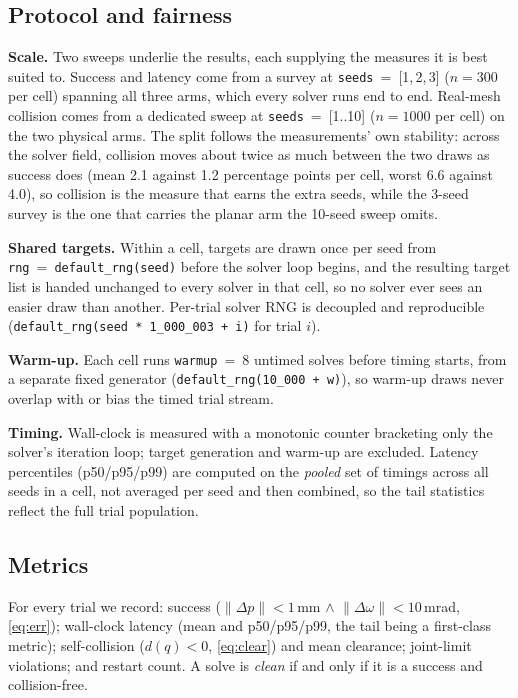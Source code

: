 \documentclass[10pt,conference]{IEEEtran}
\begin{document}
\subsection{Protocol and fairness}
\label{sec:protocol}

\textbf{Scale.} Two sweeps underlie the results, each supplying the measures it
is best suited to. Success and latency come from a survey at
\texttt{seeds}~=~[1,\,2,\,3] ($n = 300$ per cell) spanning all three arms, which
every solver runs end to end. Real-mesh collision comes from a dedicated sweep at
\texttt{seeds}~=~[1..10] ($n = 1000$ per cell) on the two physical arms. The
split follows the measurements' own stability: across the solver field, collision
moves about twice as much between the two draws as success does (mean 2.1 against
1.2 percentage points per cell, worst 6.6 against 4.0), so collision is the
measure that earns the extra seeds, while the 3-seed survey is the one that
carries the planar arm the 10-seed sweep omits.

\textbf{Shared targets.} Within a cell, targets are drawn once per seed from
\texttt{rng}~=~\texttt{default\_rng(seed)} before the solver loop begins, and the
resulting target list is handed unchanged to every solver in that cell, so no
solver ever sees an easier draw than another. Per-trial solver RNG is decoupled
and reproducible (\texttt{default\_rng(seed * 1\_000\_003 + i)} for trial $i$).

\textbf{Warm-up.} Each cell runs \texttt{warmup}~=~8 untimed solves before timing
starts, from a separate fixed generator (\texttt{default\_rng(10\_000 + w)}), so
warm-up draws never overlap with or bias the timed trial stream.

\textbf{Timing.} Wall-clock is measured with a monotonic counter bracketing only
the solver's iteration loop; target generation and warm-up are excluded. Latency
percentiles (p50/p95/p99) are computed on the \emph{pooled} set of timings across
all seeds in a cell, not averaged per seed and then combined, so the tail
statistics reflect the full trial population.

\subsection{Metrics}
\label{sec:metrics}

For every trial we record: success
($\|\Delta p\| < 1$\,mm $\wedge$ $\|\Delta\omega\| < 10$\,mrad,
\eqref{eq:err}); wall-clock latency (mean and p50/p95/p99, the tail being a
first-class metric); self-collision ($d(q) < 0$, \eqref{eq:clear}) and mean
clearance; joint-limit violations; and restart count. A solve is \emph{clean} if
and only if it is a success and collision-free.
\end{document}
